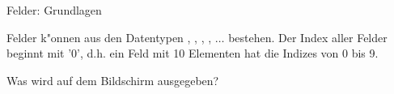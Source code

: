 \begin{frame}[t]%
\medskip

\begin{exercise}{Felder: Grundlagen}
\begin{body}
Felder k"onnen aus den Datentypen , , , , $\ldots$ bestehen.
Der Index aller Felder beginnt mit '0', d.h. ein Feld mit 10 Elementen hat die Indizes von 0 bis 9.
\medskip



Was wird auf dem Bildschirm ausgegeben?
\end{body}
\end{exercise}
\end{frame}
